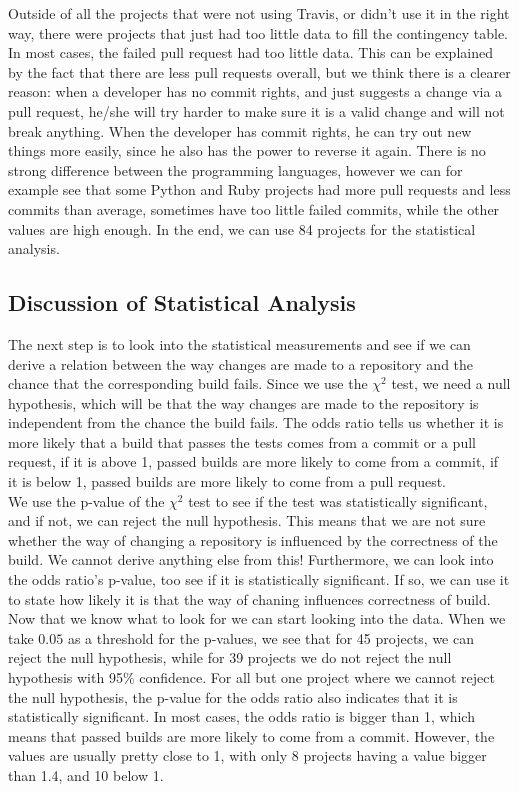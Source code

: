 \documentclass[a4paper,11pt]{article}
\begin{document}
			Outside of all the projects that were not using Travis, or didn't use it in the right way, there were projects that just had too little data to fill the contingency table. In most cases, the failed pull request had too little data. This can be explained by the fact that there are less pull requests overall, but we think there is a clearer reason: when a developer has no commit rights, and just suggests a change via a pull request, he/she will try harder to make sure it is a valid change and will not break anything. When the developer has commit rights, he can try out new things more easily, since he also has the power to reverse it again. There is no strong difference between the programming languages, however we can for example see that some Python and Ruby projects had more pull requests and less commits than average, sometimes have too little failed commits, while the other values are high enough. In the end, we can use 84 projects for the statistical analysis. \\
			
		\subsection{Discussion of Statistical Analysis}
			The next step is to look into the statistical measurements and see if we can derive a relation between the way changes are made to a repository and the chance that the corresponding build fails. Since we use the $\chi^2$ test, we need a null hypothesis, which will be that the way changes are made to the repository is independent from the chance the build fails. The odds ratio tells us whether it is more likely that a build that passes the tests comes from a commit or a pull request, if it is above 1, passed builds are more likely to come from a commit, if it is below 1, passed builds are more likely to come from a pull request. \\

			We use the p-value of the $\chi^2$ test to see if the test was statistically significant, and if not, we can reject the null hypothesis. This means that we are not sure whether the way of changing a repository is influenced by the correctness of the build. We cannot derive anything else from this! Furthermore, we can look into the odds ratio's p-value, too see if it is statistically significant. If so, we can use it to state how likely it is that the way of chaning influences correctness of build. \\
			
			Now that we know what to look for we can start looking into the data. When we take $0.05$ as a threshold for the p-values, we see that for 45 projects, we can reject the null hypothesis, while for 39 projects we do not reject the null hypothesis with 95\% confidence. For all but one project where we cannot reject the null hypothesis, the p-value for the odds ratio also indicates that it is statistically significant. In most cases, the odds ratio is bigger than 1, which means that passed builds are more likely to come from a commit. However, the values are usually pretty close to 1, with only 8 projects having a value bigger than 1.4, and 10 below 1.\\
\end{document}
